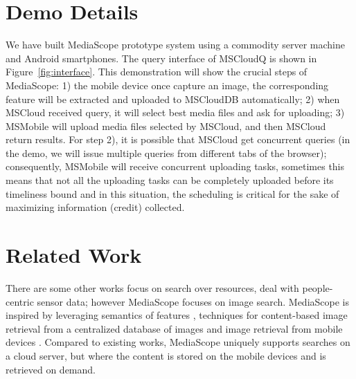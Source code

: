 \documentclass{sig-alt-release2}
\begin{document}
\section{Demo Details}
We have built MediaScope prototype system using a commodity server
machine and Android smartphones. The query interface of MSCloudQ
is shown in Figure~\ref{fig:interface}. This demonstration will
show the crucial steps of MediaScope: 1) the mobile device once
capture an image, the corresponding feature will be extracted and
uploaded to MSCloudDB automatically; 2) when MSCloud received
query, it will select best media files and ask for uploading; 3)
MSMobile will upload media files selected by MSCloud, and then
MSCloud return results. For step 2), it is possible that MSCloud
get concurrent queries (in the demo, we will issue multiple
queries from different tabs of the browser); consequently,
MSMobile will receive concurrent uploading tasks, sometimes this
means that not all the uploading tasks can be completely uploaded
before its timeliness bound and in this situation, the scheduling
is critical for the sake of maximizing information (credit)
collected.
\vspace{-0.3cm}
\section{Related Work}
There are some other works focus on search over resources,
\cite{sensorranking} deal with people-centric sensor data; however
MediaScope focuses on image search. MediaScope is inspired by leveraging
semantics of features \cite{crowdsearch,photonet}, techniques for
content-based image retrieval from a centralized database of
images \cite{faceted,imgseek} and image retrieval from
mobile devices \cite{content1,content2}. Compared to
existing works, MediaScope uniquely supports searches on a cloud
server, but where the content is stored on the mobile devices and
is retrieved on demand.

%
\vspace{-0.3cm}

\small{\small{}}  %
%
%

\end{document}
